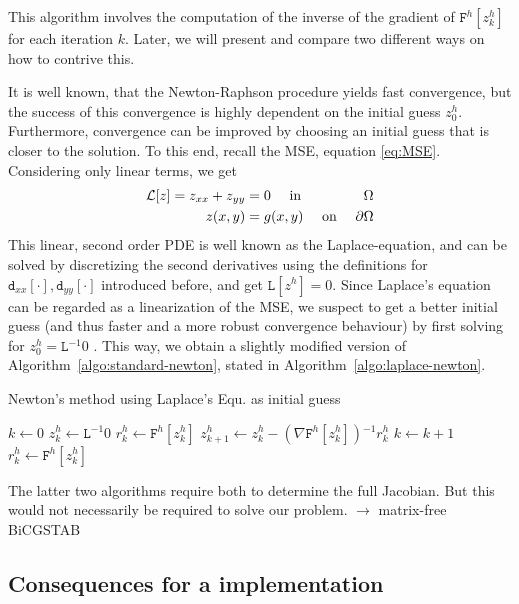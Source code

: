 \documentclass[11pt]{scrartcl}
\newcommand{\mSurfDisc}[1]{\ensuremath{\mathtt{F}^h\left[#1\right]}}
\newcommand{\Dxx}[1]{\ensuremath{\mathtt{d}_{xx}[#1]}}
\newcommand{\Dyy}[1]{\ensuremath{\mathtt{d}_{yy}[#1]}}
\newcommand{\inv}{\ensuremath{^{-1}}}
\begin{document}
This algorithm involves the computation of the inverse of the gradient of $\mSurfDisc{z^h_k}$ for each iteration $k$. Later, we will present and compare two different ways on how to contrive this.

It is well known, that the Newton-Raphson procedure yields fast convergence, but the success of this convergence is highly dependent on the initial guess $z^h_0$. Furthermore, convergence can be improved by choosing an initial guess that is closer to the solution. 
To this end, recall the MSE, equation \eqref{eq:MSE}. Considering only linear terms, we get 
\begin{align}
	\mathcal{L} [z] = z_{xx} + z_{yy} &= 0 \quad \text{ in }& \Omega \\
	z(x,y) &= g(x,y) \quad \text{ on }& \partial\Omega \notag 
\end{align}
This linear, second order PDE is well known as the Laplace-equation, and can be solved by discretizing the second derivatives using the definitions for $\Dxx{\cdot},\Dyy{\cdot}$ introduced before, and get $\mathtt{L}[z^h]=0 $. Since Laplace's equation can be regarded as a linearization of the MSE, we suspect to get a better initial guess (and thus faster and a more robust convergence behaviour) by first solving for $z^h_0= \mathtt{L}\inv 0$ . This way, we obtain a slightly modified version of Algorithm~\ref{algo:standard-newton}, stated in Algorithm~\ref{algo:laplace-newton}.

\begin{algorithm}
	\caption{Newton's method using Laplace's Equ. as initial guess}\label{algo:laplace-newton}
	\begin{algorithmic}
		\State $k \gets 0$ 
		\State $z^h_k \gets \mathtt{L}\inv 0 $ 
		\State $r^h_k \gets \mSurfDisc{z^h_k}$
		\State $z^h_{k+1} \gets z^h_{k} - \left(\nabla\mSurfDisc{z^h_k}\right)\inv r^h_k $
		\State $k \gets k+1$ 
		\State $r^h_k \gets \mSurfDisc{z^h_k}$
		\EndWhile
	\end{algorithmic}
\end{algorithm}

The latter two algorithms require both to determine the full Jacobian. But this would not necessarily be required to solve our problem.
$\rightarrow$ matrix-free BiCGSTAB

\subsection{Consequences for a implementation}
\end{document}
